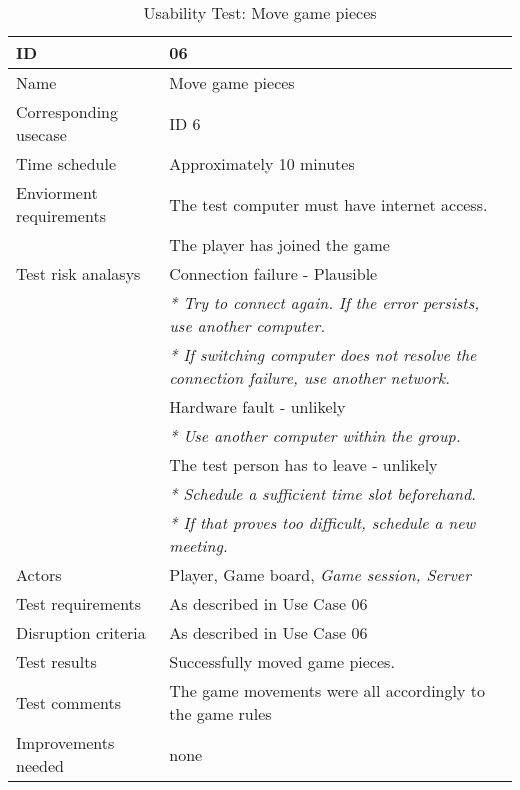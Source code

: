 {\footnotesize
\begin{table}[H]
\begin{tabular}{| p{5cm} | p{10cm} |}\hline
	\textbf{ID}	& \textbf{06} \\ \hline
	Name		& Move game pieces\\ \hline
	Corresponding usecase & ID 6\\ \hline
	Time schedule	& Approximately 10 minutes\\ \hline
	Enviorment requirements 
		& The test computer must have internet access. \\ 
		& The player has joined the game\\ \hline
	Test risk analasys 
		& Connection failure - Plausible \\
		& \emph{* Try to connect again. If the error persists, use another computer.} \\
		& \emph{* If switching computer does not resolve the connection failure, use another network.}\\
		& Hardware fault - unlikely \\
		& \emph{* Use another computer within the group.} \\
		& The test person has to leave - unlikely \\
		& \emph{* Schedule a sufficient time slot beforehand.} \\
		& \emph{* If that proves too difficult, schedule a new meeting.}\\ \hline
	Actors	& Player, Game board, \emph{Game session, Server}\\ \hline
	Test requirements & As described in Use Case 06 \\ \hline
	Disruption criteria & As described in Use Case 06  \\ \hline
	Test results & Successfully moved game pieces. \\ \hline
	Test comments & The game movements were all accordingly to the game rules \\ \hline
	Improvements needed & none \\ \hline
\end{tabular}


\caption{Usability Test: Move game pieces}
\label{fig:usability_test_6}
\end{table}}


